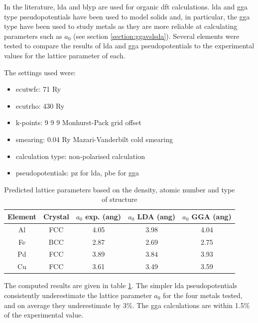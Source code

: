 In the literature, \acrshort{lda} and \acrshort{blyp} are used for organic \acrshort{dft} calculations.  \acrshort{lda} and \acrshort{gga} type pseudopotentials have been used to model solids and, in particular, the \acrshort{gga} type have been used to study metals as they are more reliable at calculating parameters such as $a_0$ (see section \ref{section:ggavslsda}).  Several elements were tested to compare the results of \acrshort{lda} and \acrshort{gga} pseudopotentials to the experimental values for the lattice parameter of each.

The settings used were:

\begin{itemize}
\item ecutwfc: 71 Ry 
\item ecutrho: 430 Ry 
\item k-points: 9 9 9 Monhurst-Pack grid offset
\item smearing: 0.04 Ry Mazari-Vanderbilt cold smearing
\item calculation type: non-polarised calculation
\item pseudopotentials: \acrshort{pz} for \acrshort{lda}, \acrshort{pbe} for \acrshort{gga}
\end{itemize}

\begin{table}[h]
\begin{center}
\begin{tabular}{c c c c c}
\hline\hline
Element & Crystal & $a_0$ exp. (ang) & $a_0$ LDA (ang) & $a_0$ GGA (ang) \\
\hline\hline
Al     & FCC  &  4.05  &  3.98  &  4.04   \\ 
Fe     & BCC  &  2.87  &  2.69  &  2.75   \\ 
Pd     & FCC  &  3.89  &  3.84  &  3.93   \\ 
Cu     & FCC  &  3.61  &  3.49  &  3.59   \\ 
\hline\hline
\end{tabular}
\end{center}
\caption{Predicted lattice parameters based on the density, atomic number and type of structure}
\label{table:computedlattice}
\end{table}

The computed results are given in table \ref{table:computedlattice}.  The simpler \acrshort{lda} pseudopotentials consistently underestimate the lattice parameter $a_0$ for the four metals tested, and on average they underestimate by 3\%.  The \acrshort{gga} calculations are within 1.5\% of the experimental value.


